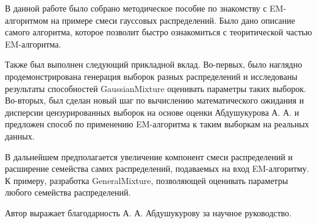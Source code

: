     В данной работе было собрано методическое пособие по знакомству с EM-алгоритмом на примере смеси гауссовых распределений. Было дано описание самого алгоритма, которое позволит быстро ознакомиться с теоритической частью EM-алгоритма.
    
    Также был выполнен следующий прикладной вклад. Во-первых, было наглядно продемонстрирована генерация выборок разных распределений и исследованы результаты способностей GaussianMixture оценивать параметры таких выборок. Во-вторых, был сделан новый шаг по вычислению математического ожидания и дисперсии цензурированных выборок на основе оценки Абдушукурова А. А. и предложен способ по применению EM-алгоритма к таким выборкам на реальных данных.
    
    В дальнейшем предполагается увеличение компонент смеси распределений и расширение семейства самих распределений, подаваемых на вход EM-алгоритму. К примеру, разработка GeneralMixture, позволяющей оценивать параметры любого семейства распределений.
    
    Автор выражает благодарность А. А. Абдушукурову за научное руководство.